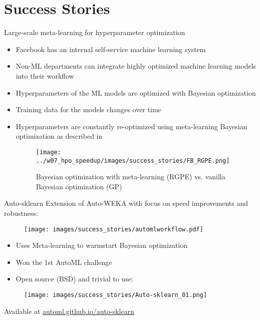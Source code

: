 \section{Success Stories}

\begin{frame}[c]{Large-scale meta-learning for hyperparameter optimization}

\begin{itemize}
    \item Facebook has an internal self-service machine learning system
    \item Non-ML departments can integrate highly optimized machine learning models into their workflow
    \item Hyperparameters of the ML models are optimized with Bayesian optimization
    \item Training data for the models changes over time \item Hyperparameters are constantly re-optimized using meta-learning Bayesian optimization as described in 
    \begin{figure}
        \centering
        \texttt{[image: ../w07\_hpo\_speedup/images/success\_stories/FB\_RGPE.png]}
        \caption{Bayesian optimization with meta-learning (RGPE) vs. vanilla Bayesian optimization (GP)}
    \end{figure}
\end{itemize}

\end{frame}


\begin{frame}[c]{Auto-sklearn}
Extension of Auto-WEKA with focus on speed improvements and robustness:
\begin{figure}
    \centering
    \texttt{[image: images/success\_stories/automlworkflow.pdf]}
\end{figure}
\begin{itemize}
    \item Uses Meta-learning to warmstart Bayesian optimization
    \item Won the 1st AutoML challenge
    \item Open source (BSD) and trivial to use:
\end{itemize}
\begin{figure}
    \centering
    \texttt{[image: images/success\_stories/Auto-sklearn\_01.png]}
\end{figure}
Available at \href{http://automl.github.io/auto-sklearn}{automl.github.io/auto-sklearn}
\end{frame}

